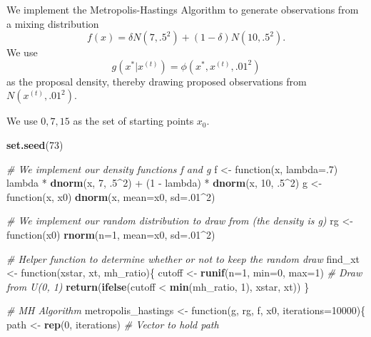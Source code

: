 \documentclass[]{article}
\newenvironment{Shaded}{\begin{snugshade}}{\end{snugshade}}
\newcommand{\KeywordTok}[1]{\textcolor[rgb]{0.13,0.29,0.53}{\textbf{{#1}}}}
\newcommand{\DataTypeTok}[1]{\textcolor[rgb]{0.13,0.29,0.53}{{#1}}}
\newcommand{\DecValTok}[1]{\textcolor[rgb]{0.00,0.00,0.81}{{#1}}}
\newcommand{\StringTok}[1]{\textcolor[rgb]{0.31,0.60,0.02}{{#1}}}
\newcommand{\CommentTok}[1]{\textcolor[rgb]{0.56,0.35,0.01}{\textit{{#1}}}}
\newcommand{\NormalTok}[1]{{#1}}
\begin{document}
We implement the Metropolis-Hastings Algorithm to generate observations
from a mixing distribution \[
f(x) = \delta N(7, .5^2) + (1 - \delta)N(10, .5^2).
\] We use \[
g(x^* \vert x^{(t)}) = \phi(x^*, x^{(t)}, .01^2)
\] as the proposal density, thereby drawing proposed observations from
\(N(x^{(t)}, .01^2)\).

We use \({0, 7, 15}\) as the set of starting points \(x_0\).

\begin{Shaded}
\begin{Highlighting}[]
\KeywordTok{set.seed}\NormalTok{(}\DecValTok{73}\NormalTok{)}

\CommentTok{# We implement our density functions f and g}
\NormalTok{f <-}\StringTok{ }\NormalTok{function(x, }\DataTypeTok{lambda=}\NormalTok{.}\DecValTok{7}\NormalTok{) lambda *}\StringTok{ }\KeywordTok{dnorm}\NormalTok{(x, }\DecValTok{7}\NormalTok{, .}\DecValTok{5}\NormalTok{^}\DecValTok{2}\NormalTok{) +}\StringTok{ }\NormalTok{(}\DecValTok{1} \NormalTok{-}\StringTok{ }\NormalTok{lambda) *}\StringTok{ }\KeywordTok{dnorm}\NormalTok{(x, }\DecValTok{10}\NormalTok{, .}\DecValTok{5}\NormalTok{^}\DecValTok{2}\NormalTok{)}
\NormalTok{g <-}\StringTok{ }\NormalTok{function(x, x0) }\KeywordTok{dnorm}\NormalTok{(x, }\DataTypeTok{mean=}\NormalTok{x0, }\DataTypeTok{sd=}\NormalTok{.}\DecValTok{01}\NormalTok{^}\DecValTok{2}\NormalTok{)}

\CommentTok{# We implement our random distribution to draw from (the density is g)}
\NormalTok{rg <-}\StringTok{ }\NormalTok{function(x0) }\KeywordTok{rnorm}\NormalTok{(}\DataTypeTok{n=}\DecValTok{1}\NormalTok{, }\DataTypeTok{mean=}\NormalTok{x0, }\DataTypeTok{sd=}\NormalTok{.}\DecValTok{01}\NormalTok{^}\DecValTok{2}\NormalTok{)}

\CommentTok{# Helper function to determine whether or not to keep the random draw}
\NormalTok{find_xt <-}\StringTok{ }\NormalTok{function(xstar, xt, mh_ratio)\{}
  \NormalTok{cutoff <-}\StringTok{ }\KeywordTok{runif}\NormalTok{(}\DataTypeTok{n=}\DecValTok{1}\NormalTok{, }\DataTypeTok{min=}\DecValTok{0}\NormalTok{, }\DataTypeTok{max=}\DecValTok{1}\NormalTok{) }\CommentTok{# Draw from U(0, 1)}
  \KeywordTok{return}\NormalTok{(}\KeywordTok{ifelse}\NormalTok{(cutoff <}\StringTok{ }\KeywordTok{min}\NormalTok{(mh_ratio, }\DecValTok{1}\NormalTok{), xstar, xt)) }
\NormalTok{\}}

\CommentTok{# MH Algorithm }
\NormalTok{metropolis_hastings <-}\StringTok{ }\NormalTok{function(g, rg,  f, x0, }\DataTypeTok{iterations=}\DecValTok{10000}\NormalTok{)\{}
  \NormalTok{path <-}\StringTok{ }\KeywordTok{rep}\NormalTok{(}\DecValTok{0}\NormalTok{, iterations) }\CommentTok{# Vector to hold path}
  

\end{Highlighting}
\end{Shaded}
\end{document}
